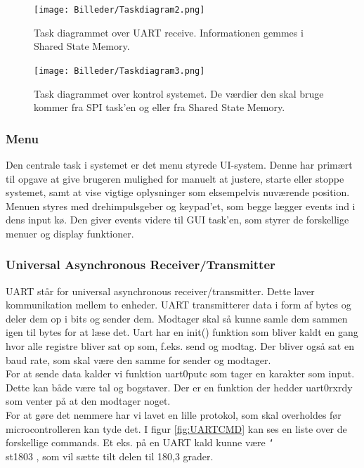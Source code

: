 \begin{figure}[ht]
			\begin{center}
\texttt{[image: Billeder/Taskdiagram2.png]}
			\end{center}
	\caption{Task diagrammet over UART receive. Informationen gemmes i Shared State Memory.}
	\label{fig:task2}
\end{figure}

\begin{figure}[ht]
			\begin{center}
\texttt{[image: Billeder/Taskdiagram3.png]}
			\end{center}
	\caption{Task diagrammet over kontrol systemet. De værdier den skal bruge kommer fra SPI task'en og eller fra Shared State Memory.}
	\label{fig:task3}
\end{figure}

\subsubsection{Menu}

Den centrale task i systemet er det menu styrede UI-system. Denne har primært til opgave at give brugeren mulighed for manuelt at justere, starte eller stoppe systemet, samt at vise vigtige oplysninger som eksempelvis nuværende position. Menuen styres med drehimpulsgeber og keypad'et, som begge lægger events ind i dens input kø. Den giver events videre til GUI task'en, som styrer de forskellige menuer og display funktioner.



\subsubsection{Universal Asynchronous Receiver/Transmitter}

UART står for universal asynchronous receiver/transmitter. Dette laver kommunikation mellem to enheder. UART transmitterer data i form af bytes og deler dem op i bits og sender dem. Modtager skal så kunne samle dem sammen igen til bytes for at læse det. Uart har en init() funktion som bliver kaldt en gang hvor alle registre bliver sat op som, f.eks. send og modtag. Der bliver også sat en baud rate, som skal være den samme for sender og modtager.
\\
For at sende data kalder vi funktion uart0\textunderscore putc som tager en karakter som input. Dette kan både være tal og bogstaver. Der er en funktion der hedder uart0\textunderscore rx\textunderscore rdy som venter på at den modtager noget.
\\
For at gøre det nemmere har vi lavet en lille protokol, som skal overholdes før microcontrolleren kan tyde det. I figur \ref{fig:UARTCMD} kan ses en liste over de forskellige commands. Et eks. på en UART kald kunne være \texttt{\char`\\}st1803 , som vil sætte tilt delen til 180,3 grader.

